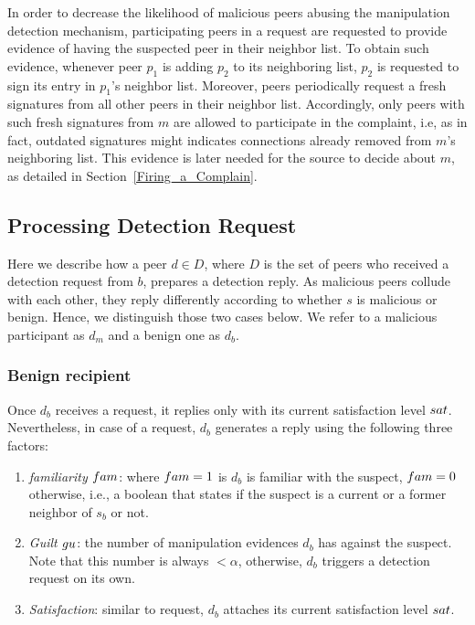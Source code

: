 In order to decrease the likelihood of malicious peers abusing the manipulation detection mechanism, participating peers in a \block request are requested to provide evidence of having the suspected peer in their neighbor list.
To obtain such evidence, whenever peer $p_1$ is adding $p_2$ to its neighboring list, $p_2$ is requested to sign its entry in $p_1$'s neighbor list.
Moreover, peers periodically request a fresh signatures from all other peers in their neighbor list.
Accordingly, only peers with such fresh signatures from $m$ are allowed to participate in the complaint, i.e, as in fact, outdated signatures might indicates connections already removed from $m$'s neighboring list.
This evidence is later needed for the source to decide about $m$, as detailed in Section~\ref{Firing_a_Complain}.

\subsection{Processing Detection Request}
Here we describe how a peer $d \in D$, where $D$ is the set of peers who received a detection request from $b$, prepares a detection reply.
As malicious peers collude with each other, they reply differently according to whether $s$ is malicious or benign.
Hence, we distinguish those two cases below. We refer to a malicious participant as $d_m$ and a benign one as $d_b$.

\subsubsection*{Benign recipient}
Once $d_b$ receives a \drop request, it replies only with its current satisfaction level $sat$.
Nevertheless, in case of a \block request, $d_b$ generates a reply using the following three factors:
\begin{enumerate}
 \item \textit{familiarity $fam$}: where $fam=1$ is $d_b$ is familiar with the suspect, $fam=0$ otherwise, i.e., a boolean that states if the suspect is a current or a former neighbor of $s_b$ or not.
 \item \textit{Guilt $gu$}: the number of manipulation evidences $d_b$ has against the suspect.
 Note that this number is always $<\alpha$, otherwise, $d_b$ triggers a detection request on its own.
 \item \textit{Satisfaction}: similar to \drop request, $d_b$ attaches its current satisfaction level $sat$.
\end{enumerate}


